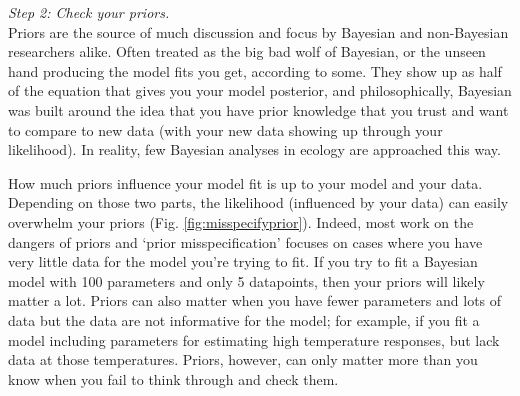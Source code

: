 \documentclass[11pt]{article}
\begin{document}
{%
\emph{Step 2: Check your priors.} \\
Priors are the source of much discussion and focus by Bayesian and non-Bayesian researchers alike. Often treated as the big bad wolf of Bayesian, or the unseen hand producing the model fits you get, according to some. They show up as half of the equation that gives you your model posterior, and philosophically, Bayesian was built around the idea that you have prior knowledge that you trust and want to compare to new data (with your new data showing up through your likelihood). In reality, few Bayesian analyses in ecology are approached this way. 

How much priors influence your model fit is up to your model and your data. Depending on those two parts, the likelihood (influenced by your data) can easily overwhelm your priors (Fig. \ref{fig:misspecifyprior}). Indeed, most work on the dangers of priors and `prior misspecification'  focuses on cases where you have very little data for the model you're trying to fit. If you try to fit a Bayesian model with 100 parameters and only 5 datapoints, then your priors will likely matter a lot. Priors can also matter when you have fewer parameters and lots of data but the data are not informative for the model; for example, if you fit a model including parameters for estimating high temperature responses, but lack data at those temperatures. Priors, however, can only matter more than you know when you fail to think through and check them. 

}
\end{document}
